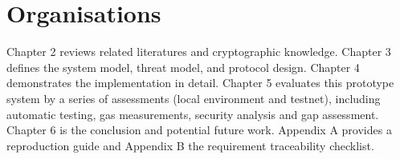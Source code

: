 \section{Organisations}

Chapter 2 reviews related literatures and cryptographic knowledge. Chapter 3 defines the system model, threat model, and protocol design. Chapter 4 demonstrates the implementation in detail. Chapter 5 evaluates this prototype system by a series of assessments (local environment and testnet), including automatic testing, gas measurements, security analysis and gap assessment. Chapter 6 is the conclusion and potential future work. Appendix A provides a reproduction guide and Appendix B the requirement traceability checklist.

\endgroup
